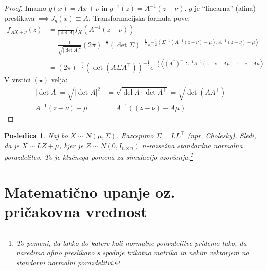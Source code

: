 \documentclass[12pt]{book}
\theoremstyle{definition}
\theoremstyle{plain}
\theoremstyle{plain}
\theoremstyle{plain}
\newtheorem{posledica}{Posledica}
\theoremstyle{remark}
\begin{document}
\begin{proof}
    Imamo $g(x)=A x+\nu$ in $g^{-1}(z)=A^{-1}(z-\nu)$. $g$ je “linearna” (afina) preslikava $\implies J_g(x) \equiv A$. Transformacijska formula pove: 
    \begin{align*}
        f_{A X+\nu}(z)&=\frac{1}{|\det A|} f_X\left(A^{-1}(z-\nu)\right) \\
        &=\frac{1}{\sqrt{|\det A|^2}}(2 \pi)^{-\frac{n}{2}}(\det \Sigma)^{-\frac{1}{2}} e^{-\frac{1}{2}\left\langle\Sigma^{-1}\left(A^{-1}(z - \nu)-\mu\right), A^{-1}(z-\nu)-\mu\right\rangle} \tag{$\star$} \\
        &=(2 \pi)^{-\frac{n}{2}}\left(\det\left(A \Sigma A^{\top}\right)\right)^{-\frac{1}{2}} e^{-\frac{1}{2}\left\langle\left(A^{\top}\right)^{-1} \Sigma^{-1} A^{-1}(z-\nu-A \mu), z-\nu - A\mu\right\rangle} 
    \end{align*}
    V vrstici $(\star)$ velja: 
    $$
    \begin{aligned}
        |\det A|=\sqrt{|\operatorname{det} A|^2}&=\sqrt{\operatorname{del} A \cdot \operatorname{det} A^{\top}}=\sqrt{\operatorname{det}\left(A A^{\top}\right)} \\
         A^{-1}(z-\nu)-\mu&=A^{-1}\left((z-\nu)-A \mu\right)    
    \end{aligned}
    $$
\end{proof}

\begin{posledica}
    Naj bo $X \sim N(\mu, \Sigma)$. Razcepimo $\Sigma=L L^{\top}$ (npr. Cholesky). Sledi, da je $X \sim L Z+\mu$, kjer je $Z \sim N\left(0, I_{n \times n}\right)$ $n$-razsežna standardna normalna porazdelitev. To je klučnega pomena za simulacijo vzorčenja.\footnote[6]{To pomeni, da lahko do katere koli normalne porazdelitve pridemo tako, da naredimo afino preslikavo s spodnje trikotno matriko in nekim vektorjem na standarni normalni porazdelitvi.}
\end{posledica}

\chapter[Matematično upanje oz. pričakovna vrednost]{Matematično upanje oz. \\ pričakovna vrednost}
\end{document}
